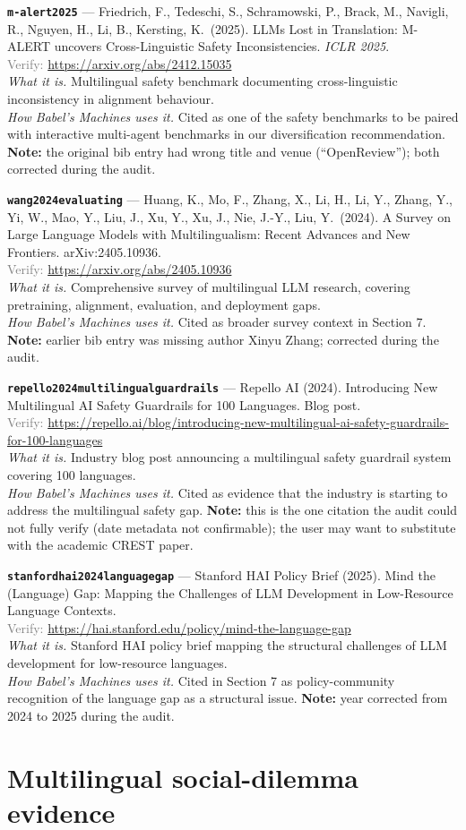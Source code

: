 \documentclass[11pt,a4paper]{article}
\newcommand{\entry}[5]{%
  \par\smallskip
  \noindent\textbf{\texttt{#1}} --- #2\\
  {\footnotesize \textcolor{gray}{Verify:} \url{#3}}\\
  \textit{What it is.} #4\\
  \textit{How Babel's Machines uses it.} #5
  \par\medskip
}
\begin{document}
\entry{m-alert2025}
{Friedrich, F., Tedeschi, S., Schramowski, P., Brack, M., Navigli, R., Nguyen, H., Li, B., Kersting, K.\ (2025). LLMs Lost in Translation: M-ALERT uncovers Cross-Linguistic Safety Inconsistencies. \emph{ICLR 2025}.}
{https://arxiv.org/abs/2412.15035}
{Multilingual safety benchmark documenting cross-linguistic inconsistency in alignment behaviour.}
{Cited as one of the safety benchmarks to be paired with interactive multi-agent benchmarks in our diversification recommendation. \textbf{Note:} the original bib entry had wrong title and venue (``OpenReview''); both corrected during the audit.}

\entry{wang2024evaluating}
{Huang, K., Mo, F., Zhang, X., Li, H., Li, Y., Zhang, Y., Yi, W., Mao, Y., Liu, J., Xu, Y., Xu, J., Nie, J.-Y., Liu, Y.\ (2024). A Survey on Large Language Models with Multilingualism: Recent Advances and New Frontiers. arXiv:2405.10936.}
{https://arxiv.org/abs/2405.10936}
{Comprehensive survey of multilingual LLM research, covering pretraining, alignment, evaluation, and deployment gaps.}
{Cited as broader survey context in Section 7. \textbf{Note:} earlier bib entry was missing author Xinyu Zhang; corrected during the audit.}

\entry{repello2024multilingualguardrails}
{Repello AI (2024). Introducing New Multilingual AI Safety Guardrails for 100 Languages. Blog post.}
{https://repello.ai/blog/introducing-new-multilingual-ai-safety-guardrails-for-100-languages}
{Industry blog post announcing a multilingual safety guardrail system covering 100 languages.}
{Cited as evidence that the industry is starting to address the multilingual safety gap. \textbf{Note:} this is the one citation the audit could not fully verify (date metadata not confirmable); the user may want to substitute with the academic CREST paper.}

\entry{stanfordhai2024languagegap}
{Stanford HAI Policy Brief (2025). Mind the (Language) Gap: Mapping the Challenges of LLM Development in Low-Resource Language Contexts.}
{https://hai.stanford.edu/policy/mind-the-language-gap}
{Stanford HAI policy brief mapping the structural challenges of LLM development for low-resource languages.}
{Cited in Section 7 as policy-community recognition of the language gap as a structural issue. \textbf{Note:} year corrected from 2024 to 2025 during the audit.}

\section{Multilingual social-dilemma evidence}
\end{document}
